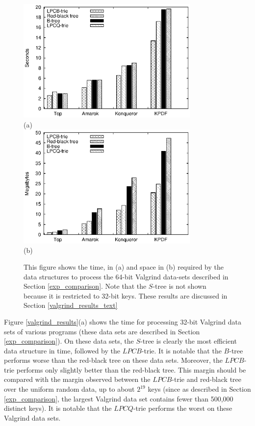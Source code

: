 \documentclass[]{acmtrans2m}
\begin{document}
{\begin{figure}
\center
\includegraphics[width=0.8\textwidth]{plots/athena_valgrind_time.eps}\\
(a)\\
\includegraphics[width=0.8\textwidth]{plots/athena_valgrind_mem.eps}\\
(b)
\caption{This figure shows the time, in (a) and space in (b) required by the
data structures to process the 64-bit Valgrind data-sets described in Section \ref{exp_comparison}.
Note that the $S$-tree is not shown because it is restricted to 32-bit keys.
These results are discussed in Section \ref{valgrind_results_text}}
\label{athena_valgrind_results}
\end{figure}
}

Figure \ref{valgrind_results}(a) shows the time for processing 32-bit Valgrind data sets of various programs (these data sets
are described in Section \ref{exp_comparison}). On these data sets, the $S$-tree is clearly the most efficient data structure in time, followed by
the $LPCB$-trie. It is notable that the $B$-tree performs worse than the red-black tree on these data sets. Moreover, the $LPCB$-trie performs
only slightly better than the red-black tree. This margin should be compared with the margin observed between the $LPCB$-trie and red-black
tree over the uniform random data, up to about $2^{19}$ keys (since as described in Section \ref{exp_comparison}, the largest Valgrind data
set contains fewer than 500,000 distinct keys). It is notable that the $LPCQ$-trie performs the worst on these Valgrind data sets. 
\end{document}
